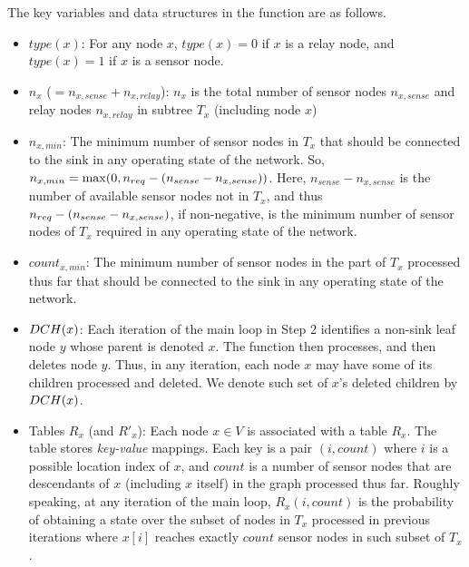 The key variables and data structures in the function are as follows.

\begin{itemize}
\item	$type(x)$:
	For any node $x$, $type(x)= 0$ if $x$ is a relay node,
	and $type(x)= 1$ if $x$ is a sensor node.

\item	$n_x$ ($=n_{x,sense} + n_{x,relay}$):
	$n_x$ is the total number of sensor nodes $n_{x,sense}$ and
	relay nodes $n_{x,relay}$ in subtree $T_x$ (including node $x$)

\item	$n_{x,min}$:
	The minimum number of sensor nodes in $T_x$ that should be connected
	to the sink in any operating state of the network.
	So, $n_{x,min}= \max(0, {n_{req}} - (n_{sense} - n_{x,sense}))$.
	Here, $n_{sense} - n_{x,sense}$ is the number of available sensor nodes
	not in $T_x$, and thus ${n_{req}} - (n_{sense} - n_{x,sense})$,
	if non-negative, is the minimum number of sensor nodes of $T_x$
	required in any operating state of the network.

\item	$count_{x,min}$:
	The minimum number of sensor nodes in the part of $T_x$ processed
	thus far that should be connected to the sink in any operating state
	of the network.

\item	${DCH}(x)$:
	Each iteration of the main loop in Step 2 identifies
	a non-sink leaf node $y$ whose parent is denoted $x$. 
	The function then processes, and then deletes node $y$.
	Thus, in any iteration, each node $x$ may have some of its children
	processed and deleted.
	We denote such set of $x$'s deleted children by ${DCH}(x)$.

\item	Tables $R_x$ (and $R'_x$):
	Each node $x \in V$ is associated with a table $R_x$.
	The table stores {\em key-value} mappings.
	Each key is a pair $(i,count)$ where $i$ is a possible location
	index of $x$, and $count$ is a number of sensor nodes that are
	descendants of $x$ (including $x$ itself) in the graph processed
	thus far.
	Roughly speaking, at any iteration of the main loop,
	$R_x(i,count)$ is the probability of obtaining a state over
	the subset of nodes in $T_x$ processed in previous iterations
	where $x[i]$ reaches exactly $count$ sensor nodes in such subset of
	$T_x$. 

\end{itemize}

